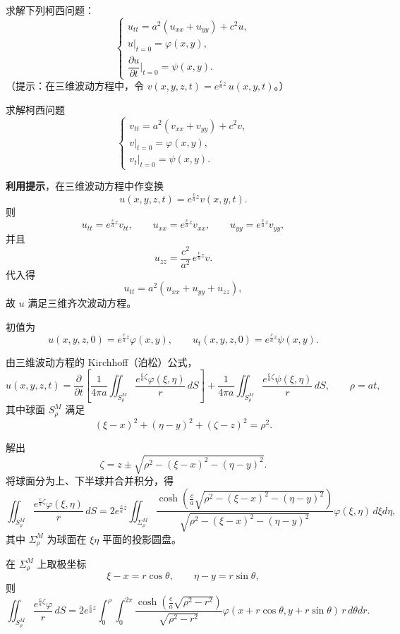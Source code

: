 \begin{homework}[5]
求解下列柯西问题：
\[
\begin{cases}
u_{tt}=a^{2}(u_{xx}+u_{yy})+c^{2}u,\\[4pt]
u\big|_{t=0}=\varphi(x,y),\\[4pt]
\dfrac{\partial u}{\partial t}\Big|_{t=0}=\psi(x,y).
\end{cases}
\]
（提示：在三维波动方程中，令 $v(x,y,z,t)=e^{\frac{c}{a}z}\,u(x,y,t)$。）
\end{homework}
\begin{solution}
求解柯西问题
\[
\begin{cases}
v_{tt}=a^{2}(v_{xx}+v_{yy})+c^{2}v,\\[3pt]
v\big|_{t=0}=\varphi(x,y),\\[3pt]
v_{t}\big|_{t=0}=\psi(x,y).
\end{cases}
\]

\textbf{利用提示}，在三维波动方程中作变换
\[
u(x,y,z,t)=e^{\frac{c}{a}z}v(x,y,t).
\]
则
\[
u_{tt}=e^{\frac{c}{a}z}v_{tt},\qquad
u_{xx}=e^{\frac{c}{a}z}v_{xx},\qquad
u_{yy}=e^{\frac{c}{a}z}v_{yy},
\]
并且
\[
u_{zz}=\frac{c^{2}}{a^{2}}\,e^{\frac{c}{a}z}v.
\]
代入得
\[
u_{tt}=a^{2}(u_{xx}+u_{yy}+u_{zz}),
\]
故 $u$ 满足三维齐次波动方程。

初值为
\[
u(x,y,z,0)=e^{\frac{c}{a}z}\varphi(x,y),\qquad
u_t(x,y,z,0)=e^{\frac{c}{a}z}\psi(x,y).
\]

由三维波动方程的 Kirchhoff（泊松）公式，
\[
u(x,y,z,t)
=
\frac{\partial}{\partial t}
\left[
\frac{1}{4\pi a}
\iint_{S^M_{\rho}}
\frac{e^{\frac{c}{a}\zeta}\varphi(\xi,\eta)}{r}\,dS
\right]
+
\frac{1}{4\pi a}
\iint_{S^M_{\rho}}
\frac{e^{\frac{c}{a}\zeta}\psi(\xi,\eta)}{r}\,dS,
\qquad \rho=at,
\]
其中球面 $S^M_{\rho}$ 满足
\[
(\xi-x)^2+(\eta-y)^2+(\zeta-z)^2=\rho^2.
\]

解出
\[
\zeta=z\pm\sqrt{\rho^2-(\xi-x)^2-(\eta-y)^2}.
\]
将球面分为上、下半球并合并积分，得
\[
\iint_{S^M_{\rho}} \frac{e^{\frac{c}{a}\zeta}\varphi(\xi,\eta)}{r}\,dS
=
2e^{\frac{c}{a}z}
\iint_{\Sigma^M_{\rho}}
\frac{
\cosh\!\left(\frac{c}{a}\sqrt{\rho^2-(\xi-x)^2-(\eta-y)^2}\right)
}{
\sqrt{\rho^2-(\xi-x)^2-(\eta-y)^2}
}
\varphi(\xi,\eta)\,d\xi d\eta,
\]
其中 $\Sigma^M_{\rho}$ 为球面在 $\xi\eta$ 平面的投影圆盘。

在 $\Sigma^M_{\rho}$ 上取极坐标
\[
\xi-x=r\cos\theta,\qquad \eta-y=r\sin\theta,
\]
则
\[
\iint_{S^M_{\rho}} \frac{e^{\frac{c}{a}\zeta}\varphi}{r}\,dS
=
2e^{\frac{c}{a}z}
\int_{0}^{\rho}\!\!\int_{0}^{2\pi}
\frac{\cosh\!\left(\frac{c}{a}\sqrt{\rho^2-r^2}\right)}
{\sqrt{\rho^2-r^2}}
\varphi(x+r\cos\theta,y+r\sin\theta)\,
r\,d\theta dr.
\]


\end{solution}
